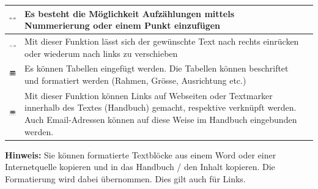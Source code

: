 \begin{tabular}{c | p{14cm} l}
\hline
\includegraphics[height=12pt]{../chapters/09_Qualitaetsmanagement/pictures/Format/Aufzaehlung.jpg} & Es besteht die Möglichkeit Aufzählungen mittels Nummerierung oder einem Punkt einzufügen \\
\hline
\includegraphics[height=12pt]{../chapters/09_Qualitaetsmanagement/pictures/Format/Einruecken.jpg} & Mit dieser Funktion lässt sich der gewünschte Text nach rechts einrücken oder wiederum nach links zu verschieben \\
\hline
\includegraphics[height=12pt]{../chapters/09_Qualitaetsmanagement/pictures/Format/Tabellen.jpg} & Es können Tabellen eingefügt werden. Die Tabellen können beschriftet und formatiert werden (Rahmen, Grösse, Ausrichtung etc.) \\
\hline
\includegraphics[height=12pt]{../chapters/09_Qualitaetsmanagement/pictures/Format/Link.jpg} & Mit dieser Funktion können Links auf Webseiten oder Textmarker innerhalb des Textes (Handbuch) gemacht, respektive verknüpft werden. Auch Email-Adressen können auf diese Weise im Handbuch eingebunden werden. \\
\hline
\end{tabular}

\vspace{\baselineskip}

\textbf{Hinweis:} Sie können formatierte Textblöcke aus einem Word oder einer Internetquelle kopieren und in das Handbuch / den Inhalt kopieren. Die Formatierung wird dabei übernommen. Dies gilt auch für Links.




